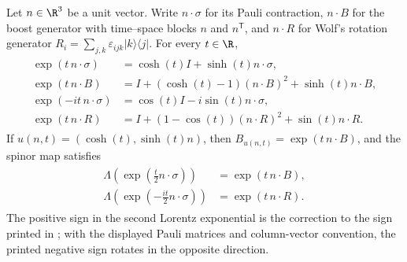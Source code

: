 \begin{theorem}
    \label{thm:spinor_boost_rotation_exponentials}
    \leanok
    Let $n\in\R^3$ be a unit vector.  Write $n\cdot\sigma$ for its Pauli
    contraction, $n\cdot B$ for the boost generator with time--space blocks
    $n$ and $n^{\mathsf T}$, and $n\cdot R$ for Wolf's rotation generator
    $R_i=\sum_{j,k}\varepsilon_{ijk}\lvert k\rangle\langle j\rvert$.
    For every $t\in\R$,
    \begin{align}
        \begin{aligned}
            \exp(t\,n\cdot\sigma)
            &=\cosh(t)I+\sinh(t)n\cdot\sigma,\\
            \exp(t\,n\cdot B)
            &=I+(\cosh(t)-1)(n\cdot B)^2+\sinh(t)n\cdot B,\\
            \exp(-it\,n\cdot\sigma)
            &=\cos(t)I-i\sin(t)n\cdot\sigma,\\
            \exp(t\,n\cdot R)
            &=I+(1-\cos(t))(n\cdot R)^2+\sin(t)n\cdot R.
        \end{aligned}
        \label{eq:representations_spinor_exponential_closed_forms}
    \end{align}
    If $u(n,t)=(\cosh(t),\sinh(t)n)$, then
    $B_{u(n,t)}=\exp(t\,n\cdot B)$, and the spinor map satisfies
    \begin{align}
        \begin{aligned}
            \Lambda\!\left(\exp\!\left(\frac{t}{2}n\cdot\sigma\right)\right)
            &=\exp(t\,n\cdot B),\\
            \Lambda\!\left(\exp\!\left(-\frac{it}{2}n\cdot\sigma\right)\right)
            &=\exp(t\,n\cdot R).
        \end{aligned}
        \label{eq:representations_spinor_exponential_map}
    \end{align}
    The positive sign in the second Lorentz exponential is the correction to
    the sign printed in \cite[Eq.~(2.44)]{Wolf2012Quantum}; with the displayed
    Pauli matrices and column-vector convention, the printed negative sign
    rotates in the opposite direction.
\end{theorem}

